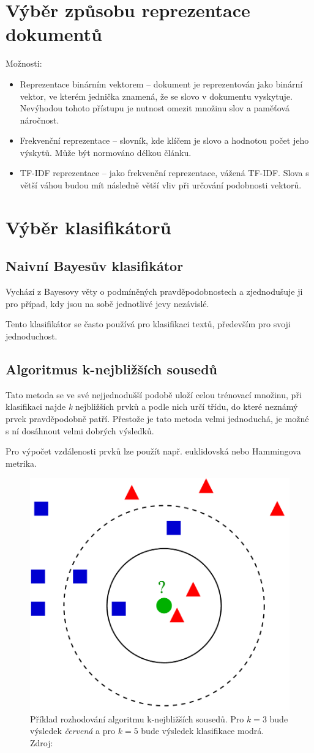 \documentclass[12pt, a4paper]{report}
\begin{document}
\section{Výběr způsobu reprezentace dokumentů}
\label{sec:fv}
Možnosti:
\begin{itemize}
	\item Reprezentace binárním vektorem -- dokument je reprezentován jako binární vektor, ve kterém jednička znamená, že se slovo v dokumentu vyskytuje. Nevýhodou tohoto přístupu je nutnost omezit množinu slov a paměťová náročnost.
	\item Frekvenční reprezentace -- slovník, kde klíčem je slovo a hodnotou počet jeho výskytů. Může být normováno délkou článku.
	\item TF-IDF reprezentace -- jako frekvenční reprezentace, vážená TF-IDF. \cite{wiki:tfidf} Slova s větší váhou budou mít následně větší vliv při určování podobnosti vektorů.
\end{itemize}\section{Výběr klasifikátorů}

\subsection*{Naivní Bayesův klasifikátor}
Vychází z Bayesovy věty o podmíněných pravděpodobnostech a zjednodušuje ji pro případ, kdy jsou na sobě jednotlivé jevy nezávislé.

Tento klasifikátor se často používá pro klasifikaci textů, především pro svoji jednoduchost. \cite{rennie2003tackling}

\subsection*{Algoritmus k-nejbližších sousedů}
Tato metoda se ve své nejjednodušší podobě uloží celou trénovací množinu, při klasifikaci najde \emph{k} nejbližších prvků a podle nich určí třídu, do které neznámý prvek pravděpodobně patří. Přestože je tato metoda velmi jednoduchá, je možné s ní dosáhnout velmi dobrých výsledků. \cite{beyer1999nearest}

Pro výpočet vzdálenosti prvků lze použít např. euklidovská nebo Hammingova metrika.

\begin{figure}[h]
	\centering
	\includegraphics[width=0.3\linewidth]{img-knn}
	\caption[]{Příklad rozhodování algoritmu k-nejbližších sousedů. Pro $k=3$ bude výsledek \emph{červená} a pro $k=5$ bude výsledek klasifikace modrá. Zdroj: \cite{wiki:knn}}
\end{figure}
\end{document}

